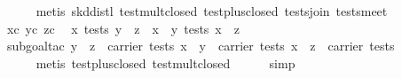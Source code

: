 \begin{isabellebody}
\ \ \ \ \isamarkupfalse%
\ {}metis\ skd{}distl\ test{}mult{}closed\ test{}plus{}closed\ tests{}join\ tests{}meet{}\isanewline
\ \ \isamarkupfalse%
\ xc\ yc\ zc\ \isamarkupfalse%
\ {}x\ {}\isactrlbsub tests\isactrlesub \ {}y\ {}\ z{}\ {}\ {}x\ {}\ y{}\ {}\isactrlbsub tests\isactrlesub \ {}x\ {}\ z{}{}\isanewline
\ \ \ \ \isamarkupfalse%
\ {}subgoal{}tac\ {}y\ {}\ z\ {}\ carrier\ tests{}\ {}x\ {}\ y\ {}\ carrier\ tests{}\ {}x\ {}\ z\ {}\ carrier\ tests{}{}\isanewline
\ \ \ \ \isamarkupfalse%
\isanewline
\ \ \ \ \isamarkupfalse%
\ {}metis\ test{}plus{}closed\ test{}mult{}closed{}{}\isanewline
\ \ \ \ \isamarkupfalse%
\ simp\isanewline
\ \ \isamarkupfalse%
\ {}\isanewline
\ \ \ \ \isamarkupfalse%

\end{isabellebody}

